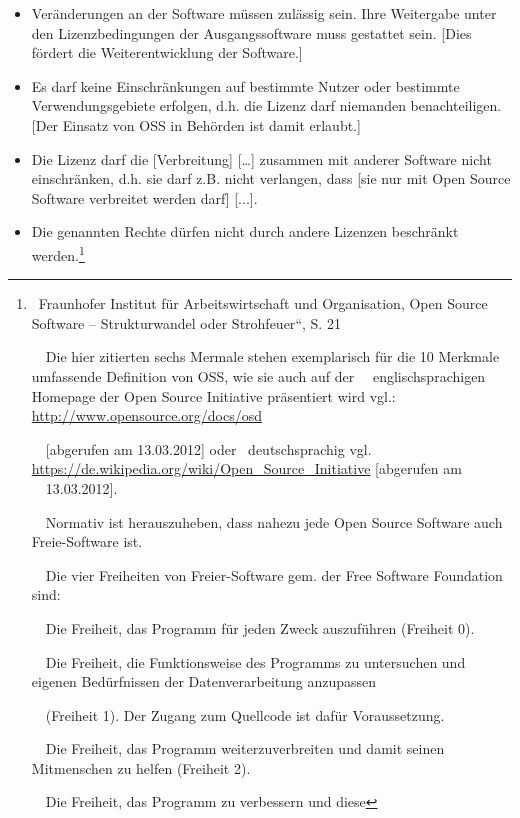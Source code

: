 \documentclass[a4paper]{article}
\begin{document}
\begin{itemize}
\item {
Ver\"anderungen an der Software m\"ussen zul\"assig sein. Ihre
Weitergabe unter den Lizenzbedingungen der Ausgangssoftware muss
gestattet sein. [Dies f\"ordert die Weiterentwicklung der Software.]}
\item {
Es darf keine Einschr\"ankungen auf bestimmte Nutzer oder bestimmte
Verwendungsgebiete erfolgen, d.h. die Lizenz darf niemanden
benachteiligen. [Der Einsatz von OSS in Beh\"orden ist damit erlaubt.]}
\item {
Die Lizenz darf die [Verbreitung] [{\dots}] zusammen mit anderer
Software nicht einschr\"anken, d.h. sie darf z.B. nicht verlangen, dass
[sie nur mit Open Source Software verbreitet werden darf] [...].}
\item {
Die genannten Rechte d\"urfen nicht durch andere Lizenzen beschr\"ankt
werden.{\guillemotleft}\footnote{\ Fraunhofer Institut f\"ur
Arbeitswirtschaft und Organisation, {\quotedblbase}Open Source Software
-- Strukturwandel oder Strohfeuer{\textquotedblleft}, S. 21\par \ \ Die
hier zitierten sechs Mermale stehen exemplarisch f\"ur die 10 Merkmale
umfassende Definition von OSS, wie sie auch auf der
\ \ englischsprachigen Homepage der Open Source Initiative
pr\"asentiert wird vgl.: \url{http://www.opensource.org/docs/osd}\par
\ \ [abgerufen am 13.03.2012] oder \ deutschsprachig vgl.
\url{https://de.wikipedia.org/wiki/Open_Source_Initiative} [abgerufen
am \ \ 13.03.2012].\par \ \ Normativ ist herauszuheben, dass nahezu
jede Open Source Software auch Freie-Software ist.\par \ \ Die vier
Freiheiten von Freier-Software gem. der Free Software Foundation
sind:\par \ \ {\guillemotright}Die Freiheit, das Programm f\"ur jeden
Zweck auszuf\"uhren (Freiheit 0).\par \ \ Die Freiheit, die
Funktionsweise des Programms zu untersuchen und eigenen Bed\"urfnissen
der Datenverarbeitung anzupassen\par \ \ (Freiheit 1). Der Zugang zum
Quellcode ist daf\"ur Voraussetzung.\par \ \ Die Freiheit, das Programm
weiterzuverbreiten und damit seinen Mitmenschen zu helfen (Freiheit 2).
\par \ \ Die Freiheit, das Programm zu verbessern und diese
}}
\end{itemize}
\end{document}
